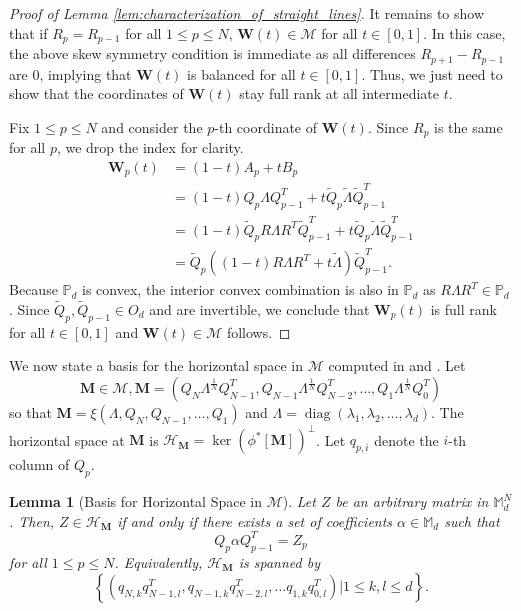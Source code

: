 \documentclass{amsart}
\DeclareMathOperator{\diag}{diag}
\newtheorem{lemma}[theorem]{Lemma}
\theoremstyle{definition}
\theoremstyle{remark}
\numberwithin{equation}{section}
\begin{document}
\begin{proof}[Proof of Lemma \ref{lem:characterization_of_straight_lines}]
    It remains to show that if $R_p = R_{p-1}$ for all $1 \leq p \leq N$, $\mathbf{W}(t) \in \mathcal{M}$ for all $t \in [0, 1]$. In this case, the above skew symmetry condition is immediate as all differences $R_{p+1} - R_{p-1}$ are $0$, implying that $\mathbf{W}(t)$ is balanced for all $t \in [0,1]$. Thus, we just need to show that the coordinates of $\mathbf{W}(t)$ stay full rank at all intermediate $t$.

    Fix $1 \leq p \leq N$ and consider the $p$-th coordinate of $\mathbf{W}(t)$. Since $R_p$ is the same for all $p$, we drop the index for clarity.
    \begin{align}
        \mathbf{W}_p(t) &= (1-t) A_p + tB_p \\
        &= (1-t) Q_p\Lambda Q_{p-1}^T + t\tilde{Q}_p\tilde{\Lambda}\tilde{Q}_{p-1}^T \\
        &= (1-t) \tilde{Q}_p R \Lambda R^T \tilde{Q}_{p-1}^T + t\tilde{Q}_p \tilde{\Lambda} \tilde{Q}_{p-1}^T \\
        &= \tilde{Q}_p \left((1-t) R\Lambda R^T + t \tilde{\Lambda}\right)\tilde{Q}_{p-1}^T.
    \end{align}
    Because $\mathbb{P}_d$ is convex, the interior convex combination is also in $\mathbb{P}_d$ as $R\Lambda R^T \in \mathbb{P}_d$. Since $\tilde{Q}_p, \tilde{Q}_{p-1} \in O_d$ and are invertible, we conclude that $\mathbf{W}_p(t)$ is full rank for all $t \in [0,1]$ and $\mathbf{W}(t) \in \mathcal{M}$ follows.
\end{proof}

We now state a basis for the horizontal space in $\mathcal{M}$ computed in \cite[Section 6]{menon2025entropy} and \cite[Theorem 34]{tianmin2024}. Let 
\begin{equation}
    \mathbf{M} \in \mathcal{M}, \mathbf{M} = \left(Q_N\Lambda^\frac{1}{N} Q_{N-1}^T, Q_{N-1}\Lambda^\frac{1}{N} Q_{N-2}^T, \dots, Q_1\Lambda^\frac{1}{N} Q_0^T\right)
\end{equation}
so that $\mathbf{M} = \xi(\Lambda, Q_N, Q_{N-1}, \ldots, Q_1)$ and $\Lambda = \diag(\lambda_1, \lambda_2, \ldots, \lambda_d)$. The horizontal space at $\mathbf{M}$ is $\mathcal{H}_\mathbf{M} = \ker (\phi^* [\mathbf{M}])^\perp$. Let $q_{p,i}$ denote the $i$-th column of $Q_p$.  
\begin{lemma}[Basis for Horizontal Space in $\mathcal{M}$]\label{lem:horizontal_system_of_equations}
Let $Z$ be an arbitrary matrix in $\mathbb{M}_d^N$. Then, $Z \in \mathcal{H}_\mathbf{M}$ if and only if there exists a set of coefficients $\alpha \in \mathbb{M}_d$ such that
\begin{equation}\label{eq:horizontal_system_of_equations}
    Q_p\alpha Q_{p-1}^T = Z_p
\end{equation}
for all $1 \leq p \leq N$. Equivalently, $\mathcal{H}_\mathbf{M}$ is spanned by
\begin{equation}
    \left\{\left(q_{N,k} q_{N-1, l}^T, q_{N-1,k} q_{N-2, l}^T, \ldots q_{1,k} q_{0, l}^T\right) | 1 \leq k, l \leq d \right\}.
\end{equation}
\end{lemma}
\end{document}
